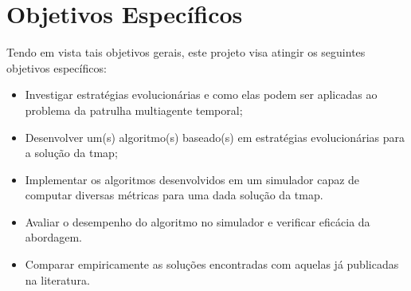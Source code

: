 \section{Objetivos Específicos}

Tendo em vista tais objetivos gerais, este projeto visa atingir os seguintes 
objetivos específicos:

\begin{itemize}
	\item Investigar estratégias evolucionárias e como elas podem ser aplicadas 
		ao problema da patrulha multiagente temporal;
	\item Desenvolver um(s) algoritmo(s) baseado(s) em estratégias 
		evolucionárias para a solução da \ac{tmap};
	\item Implementar os algoritmos desenvolvidos em um simulador capaz de 
		computar diversas métricas para uma dada solução da \ac{tmap}.
	\item Avaliar o desempenho do algoritmo no simulador e verificar eficácia
		da abordagem.
	\item Comparar empiricamente as soluções encontradas com aquelas já 
		publicadas na literatura.
\end{itemize}